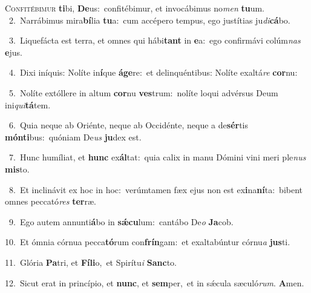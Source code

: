 \lettrine{\initial\textcolor{\initialcolor}{C}}{onfitébimur} \textbf{ti}\-bi, \textbf{De}\-us:~\star confitébimur, et invocábimus no\textit{men} \textbf{tu}\-um.\\
{\numbfont\textcolor{\numbcolor}{~2.}}~Narrábimus mira\-\textbf{bí}\-lia \textbf{tu}\-a:~\star cum accépero tempus, ego justítias ju\-\textit{di}\-\textbf{cá}bo.\par
{\numbfont\textcolor{\numbcolor}{~3.}}~Liquefácta est terra, et omnes qui hábi\textbf{tant} in \textbf{e}\-a:~\star ego confirmávi colúm\textit{nas} \textbf{e}\-jus.\par
{\numbfont\textcolor{\numbcolor}{~4.}}~Dixi iníquis: Nolíte in\-\textbf{í}\-que \textbf{á}\-\textbf{ge}re:~\star et delinquéntibus: Nolíte exaltá\textit{re} \textbf{cor}\-nu:\par
{\numbfont\textcolor{\numbcolor}{~5.}}~Nolíte extóllere in altum \textbf{cor}\-nu \textbf{ves}\-trum:~\star nolíte loqui advérsus Deum ini\-\textit{qui}\-\textbf{tá}tem.\par
{\numbfont\textcolor{\numbcolor}{~6.}}~Quia neque ab Oriénte, neque ab Occidénte, neque a de\-\textbf{sér}\-tis \textbf{món}\-\textbf{ti}bus:~\star quóniam De\textit{us} \textbf{ju}\-dex est.\par
{\numbfont\textcolor{\numbcolor}{~7.}}~Hunc humíliat, et \textbf{hunc} ex\-\textbf{ál}\-tat:~\star quia calix in manu Dómini vini meri ple\textit{nus} \textbf{mis}\-to.\par
{\numbfont\textcolor{\numbcolor}{~8.}}~Et inclinávit ex hoc in hoc:~\dagger verúmtamen fæx ejus non est ex\-\textbf{i}\-na\-\textbf{ní}\-ta:~\star bibent omnes peccató\textit{res} \textbf{ter}\-ræ.\par
{\numbfont\textcolor{\numbcolor}{~9.}}~Ego autem annunti\-\textbf{á}\-bo in \textbf{sǽ}\-\textbf{cu}lum:~\star cantábo De\textit{o} \textbf{Ja}\-cob.\par
{\numbfont\textcolor{\numbcolor}{10.}}~Et ómnia córnua pecca\-\textbf{tó}\-rum con\-\textbf{frín}\-gam:~\star et exaltabúntur córnu\textit{a} \textbf{jus}\-ti.\par
{\numbfont\textcolor{\numbcolor}{11.}}~Glória \textbf{Pa}\-tri, et \textbf{Fí}\-\textbf{li}o,~\star et Spirítu\textit{i} \textbf{Sanc}\-to.\par
{\numbfont\textcolor{\numbcolor}{12.}}~Sicut erat in princípio, et \textbf{nunc}\-, et \textbf{sem}\-per,~\star et in sǽcula sæculó\-\textit{rum}\-. \textbf{A}\-men.\par
